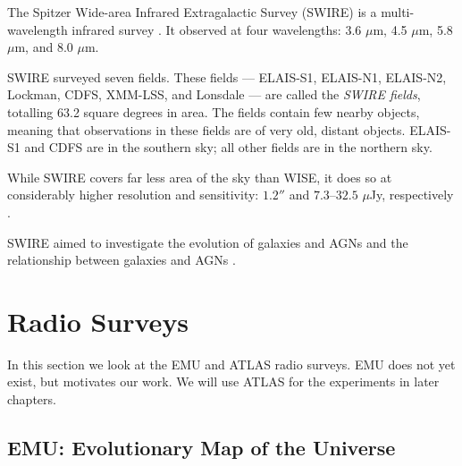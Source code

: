            The Spitzer Wide-area Infrared Extragalactic Survey (SWIRE) is a
            multi-wavelength infrared survey \citep{lonsdale03}. It observed at
            four wavelengths: 3.6 $\mu$m, 4.5 $\mu$m, 5.8 $\mu$m, and 8.0
            $\mu$m.

            SWIRE surveyed seven fields. These fields --- ELAIS-S1, ELAIS-N1,
            ELAIS-N2, Lockman, CDFS, XMM-LSS, and Lonsdale --- are called the
            \emph{SWIRE fields}, totalling 63.2 square degrees in area. The
            fields contain few nearby objects, meaning that observations in
            these fields are of very old, distant objects. ELAIS-S1 and CDFS are
            in the southern sky; all other fields are in the northern sky.

            While SWIRE covers far less area of the sky than WISE, it does so at
            considerably higher resolution and sensitivity: $1.2''$ and
            $7.3$--$32.5$ $\mu$Jy, respectively \citep{irac-pocket-guide,
            surace05}.

            SWIRE aimed to investigate the evolution of galaxies and AGNs and
            the relationship between galaxies and AGNs \citep{surace05}.


    \section{Radio Surveys}
    \label{sec:radio-surveys}

        In this section we look at the EMU and ATLAS radio surveys. EMU does not
        yet exist, but motivates our work. We will use ATLAS for the experiments
        in later chapters.

        \subsection{EMU: Evolutionary Map of the Universe}
        \label{sec:emu}


